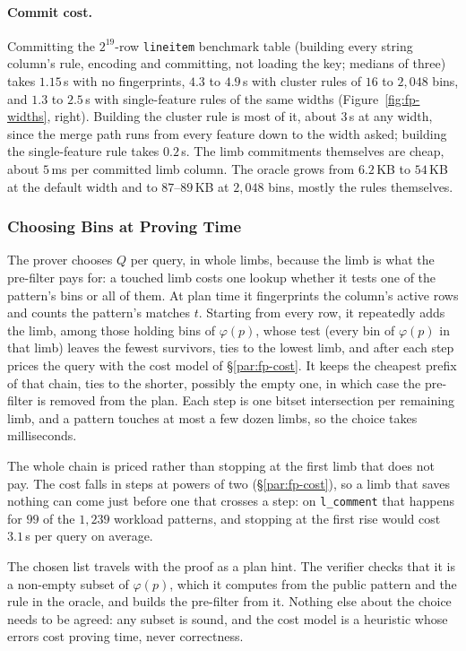 \paragraph{Commit cost.}
Committing the $2^{19}$-row \texttt{lineitem} benchmark table (building
every string column's rule, encoding and committing, not loading the
key; medians of three) takes $1.15$\,s with no fingerprints, $4.3$ to
$4.9$\,s with cluster rules of $16$ to $2{,}048$ bins, and $1.3$ to
$2.5$\,s with single-feature rules of the same widths
(Figure~\ref{fig:fp-widths}, right). Building the cluster rule is most of
it, about $3$\,s at any width, since the merge path runs from every
feature down to the width asked; building the single-feature rule takes
$0.2$\,s. The limb commitments themselves are cheap, about $5$\,ms per
committed limb column. The oracle grows from $6.2$\,KB to $54$\,KB at the
default width and to $87$--$89$\,KB at $2{,}048$ bins, mostly the rules
themselves.

\subsubsection{Choosing Bins at Proving Time}
\label{par:fp-select}

The prover chooses $Q$ per query, in whole limbs, because the limb is
what the pre-filter pays for: a touched limb costs one lookup whether it
tests one of the pattern's bins or all of them. At plan time it
fingerprints the column's active rows and counts the pattern's matches
$t$. Starting from every row, it repeatedly adds the limb, among those
holding bins of $\varphi(p)$, whose test (every bin of $\varphi(p)$ in
that limb) leaves the fewest survivors, ties to the lowest limb, and
after each step prices the query with the cost model of
\S\ref{par:fp-cost}. It keeps the cheapest prefix of that chain, ties to
the shorter, possibly the empty one, in which case the pre-filter is
removed from the plan. Each step is one bitset intersection per
remaining limb, and a pattern touches at most a few dozen limbs, so the
choice takes milliseconds.

The whole chain is priced rather than stopping at the first limb that
does not pay. The cost falls in steps at powers of two
(\S\ref{par:fp-cost}), so a limb that saves nothing can come just before
one that crosses a step: on \texttt{l\_comment} that happens for $99$ of
the $1{,}239$ workload patterns, and stopping at the first rise would
cost $3.1$\,s per query on average.

The chosen list travels with the proof as a plan hint. The verifier
checks that it is a non-empty subset of $\varphi(p)$, which it computes
from the public pattern and the rule in the oracle, and builds the
pre-filter from it. Nothing else about the choice needs to be agreed:
any subset is sound, and the cost model is a heuristic whose errors cost
proving time, never correctness.

